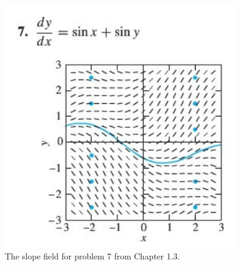 \documentclass[11pt]{article}
\begin{document}
\begin{figure}[h]
\vspace{-2mm}
\begin{center}
\includegraphics[width=4in]{slopefield_2.png}
\vspace{-2mm}
\caption{The slope field for problem 7 from Chapter 1.3.}
\vspace{-5mm}
\end{center}
\end{figure}
\end{document}
